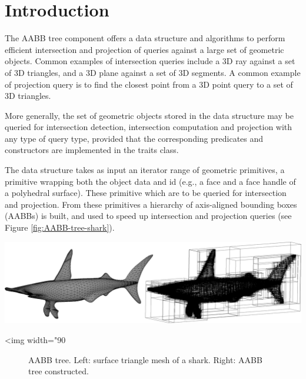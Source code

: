 \section{Introduction}
\label{AABB_tree_section_intro}

The AABB tree component offers a data structure and algorithms to perform efficient intersection and projection of queries against a large set of geometric objects. Common examples of intersection queries include a 3D ray against a set of 3D triangles, and a 3D plane against a set of 3D segments. A common example of projection query is to find the closest point from a 3D point query to a set of 3D triangles.

More generally, the set of geometric objects stored in the data structure may be queried for intersection detection, intersection computation and projection with any type of query type, provided that the corresponding predicates and constructors are implemented in the traits class. 

The data structure takes as input an iterator range of geometric primitives, a primitive wrapping both the object data and id (e.g., a face and a face handle of a polyhedral surface). These primitive which are to be queried for intersection and projection. From these primitives a hierarchy of axis-aligned bounding boxes (AABBs) is built, and used to speed up intersection and projection queries (see Figure \ref{fig:AABB-tree-shark}). 

\begin{center}
    \label{fig:AABB-tree-shark}
    \begin{ccTexOnly}
      \includegraphics[width=1.0\textwidth]{AABB_tree/shark}
    \end{ccTexOnly}
    \begin{ccHtmlOnly}
        <img width="90%
    \end{ccHtmlOnly}
    \begin{figure}[h]
        \caption{AABB tree.
                 Left: surface triangle mesh of a shark.
                 Right: AABB tree constructed.}
    \end{figure}
\end{center}

